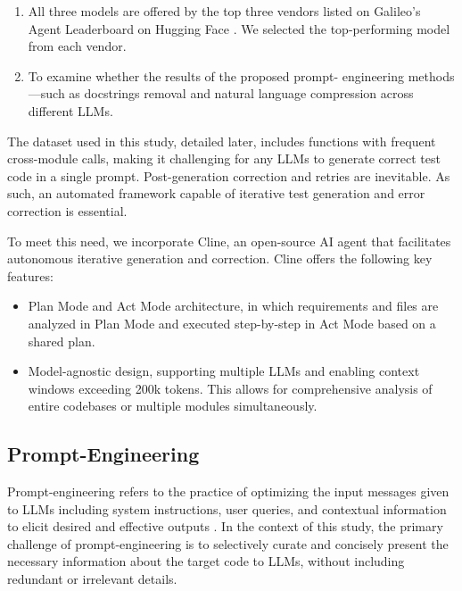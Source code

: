 \begin{enumerate}
    \item All three models are offered by the top three vendors listed on Galileo's Agent Leaderboard on Hugging Face \cite{agent_leaderboard}. We selected the top-performing model from each vendor.
\vspace{0.2cm}
    \item To examine whether the results of the proposed prompt- engineering methods—such as docstrings removal and natural language compression across different LLMs.
\end{enumerate}

The dataset used in this study, detailed later, includes functions with frequent cross-module calls, making it challenging for any LLMs to generate correct test code in a single prompt. Post-generation correction and retries are inevitable. As such, an automated framework capable of iterative test generation and error correction is essential.

To meet this need, we incorporate Cline, an open-source AI agent that facilitates autonomous iterative generation and correction. Cline offers the following key features:

\begin{itemize}[label={$\bullet$}]
    \item Plan Mode and Act Mode architecture, in which requirements and files are analyzed in Plan Mode and executed step-by-step in Act Mode based on a shared plan.
\vspace{0.2cm}
    \item Model-agnostic design, supporting multiple LLMs and enabling context windows exceeding 200k tokens. This allows for comprehensive analysis of entire codebases or multiple modules simultaneously.
\end{itemize}


\subsection{Prompt-Engineering}
Prompt-engineering refers to the practice of optimizing the input messages given to LLMs including system instructions, user queries, and contextual information to elicit desired and effective outputs \cite{llmlingua}. In the context of this study, the primary challenge of prompt-engineering is to selectively curate and concisely present the necessary information about the target code to LLMs, without including redundant or irrelevant details.

